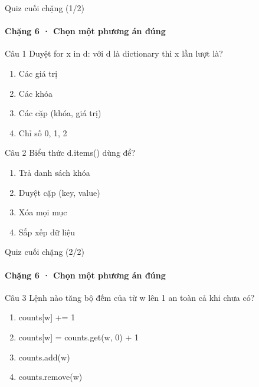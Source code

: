 \documentclass[aspectratio=169,10pt]{beamer}
\begin{document}
\begin{frame}[t]{Quiz cuối chặng (1/2)}
\framesubtitle{Chặng 6 · Chọn một phương án đúng}
\small
\begin{block}{Câu 1}
Duyệt for x in d: với d là dictionary thì x lần lượt là?\par\smallskip
\begin{enumerate}
\item Các giá trị
\item Các khóa
\item Các cặp (khóa, giá trị)
\item Chỉ số 0, 1, 2
\end{enumerate}
\end{block}
\begin{block}{Câu 2}
Biểu thức d.items() dùng để?\par\smallskip
\begin{enumerate}
\item Trả danh sách khóa
\item Duyệt cặp (key, value)
\item Xóa mọi mục
\item Sắp xếp dữ liệu
\end{enumerate}
\end{block}

\end{frame}

\begin{frame}[t]{Quiz cuối chặng (2/2)}
\framesubtitle{Chặng 6 · Chọn một phương án đúng}
\small
\begin{block}{Câu 3}
Lệnh nào tăng bộ đếm của từ w lên 1 an toàn cả khi chưa có?\par\smallskip
\begin{enumerate}
\item counts[w] += 1
\item counts[w] = counts.get(w, 0) + 1
\item counts.add(w)
\item counts.remove(w)
\end{enumerate}
\end{block}

\end{frame}
\end{document}
